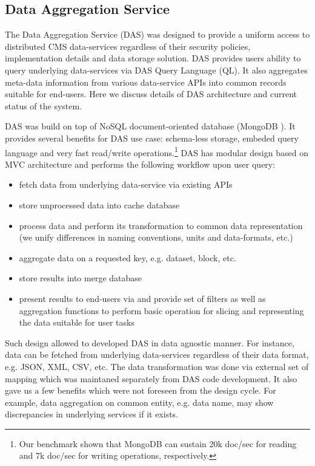 \subsection{Data Aggregation Service}

The Data Aggregation Service (DAS) \cite{DAS} was designed to provide a uniform
access to distributed CMS data-services regardless of their security policies,
implementation details and data storage solution. DAS provides users ability to
query underlying data-services via DAS Query Language (QL). It also aggregates
meta-data information from various data-service APIs into common records
suitable for end-users. Here we discuss details of DAS architecture and
current status of the system.

DAS was build on top of NoSQL document-oriented database (MongoDB
\cite{MongoDB}). It provides several benefits for DAS use case: schema-less
storage, embeded query language and very fast read/write
operations.\footnote{Our benchmark shown that MongoDB can sustain 20k doc/sec
for reading and 7k doc/sec for writing operations, respectively.}
DAS has modular design based on MVC architecture \cite{MVC} and performs the
following workflow upon user query:

\begin{itemize}
\item fetch data from underlying data-service via existing APIs
\item store unprocessed data into cache database
\item process data and perform its transformation to common data representation
(we unify differences in naming conventions, units and data-formats, etc.)
\item aggregate data on a requested key, e.g. dataset, block, etc.
\item store results into merge database
\item present results to end-users via and provide set of filters as well as
aggregation functions to perform basic operation for slicing and representing
the data suitable for user tasks
\end{itemize}

Such design allowed to developed DAS in data agnostic manner. For instance,
data can be fetched from underlying data-services regardless of their data format, e.g.
JSON, XML, CSV, etc. The data transformation was done via external set of
mapping which was maintaned separately from DAS code development. It also gave
us a few benefits which were not foreseen from the design cycle. For example,
data aggregation on common entity, e.g. data name, may show discrepancies in
underlying services if it exists.

